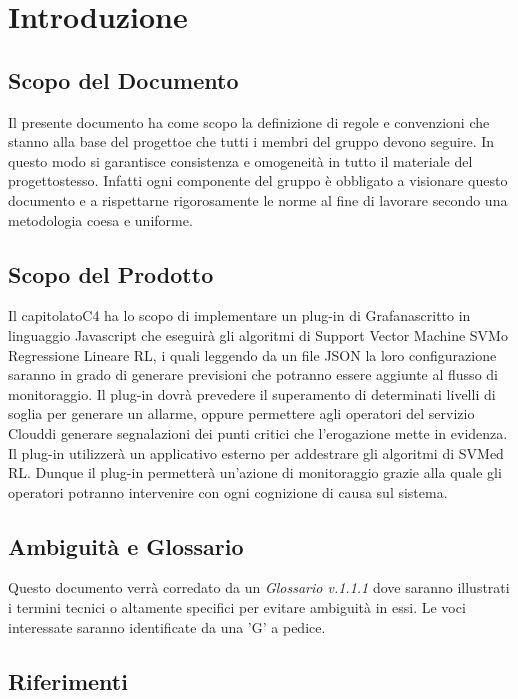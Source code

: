 \section{Introduzione}
\subsection{Scopo del Documento}
Il presente documento ha come scopo la definizione di regole e convenzioni che stanno alla base del progetto\glosp e che tutti i membri del gruppo devono seguire. In questo modo si garantisce consistenza e omogeneità in tutto il materiale del progetto\glosp stesso. Infatti ogni componente del gruppo è obbligato a visionare questo documento e a rispettarne rigorosamente le norme al fine di lavorare secondo una metodologia coesa e uniforme.
\subsection{Scopo del Prodotto}
Il capitolato\glosp C4 ha lo scopo di implementare un plug-in di Grafana\glosp scritto in linguaggio Javascript che eseguirà gli algoritmi di Support Vector Machine SVM\glosp o Regressione Lineare RL\glo, i quali leggendo da un file JSON la loro configurazione saranno in grado di generare previsioni che potranno essere aggiunte al flusso di monitoraggio. Il plug-in dovrà prevedere il superamento di determinati livelli di soglia per generare un allarme, oppure permettere agli operatori del servizio Cloud\glosp di generare segnalazioni dei punti critici che l'erogazione mette in evidenza. Il plug-in utilizzerà un applicativo esterno per addestrare gli algoritmi di SVM\glosp ed RL\glo.
Dunque il plug-in permetterà un'azione di monitoraggio grazie alla quale gli operatori potranno intervenire con ogni cognizione di causa sul sistema.
\subsection{Ambiguità e Glossario}
Questo documento verrà corredato da un \textit{Glossario v.1.1.1} dove saranno illustrati i termini tecnici o altamente specifici per evitare ambiguità in essi. Le voci interessate saranno identificate da una 'G' a pedice.
\subsection{Riferimenti}
